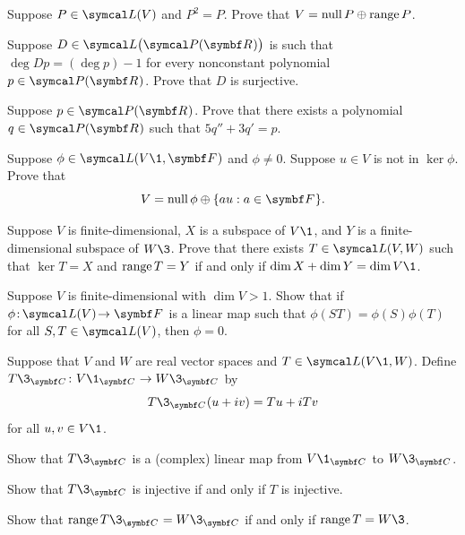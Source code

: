 \begin{exercises}

\exercise
Suppose $P \in \L(V)$ and $P^2 = P$.  Prove that $V = \operatorname{null} P \oplus \operatorname{range} P$.


\exercise
Suppose $D \in \L\bigl(\P(\R{})\bigr)$ is such that $\deg Dp = (\deg p) - 1$ for every nonconstant polynomial $p \in \P(\R{})$. Prove that $D$ is surjective.\label{3polydeg}


\exercise
Suppose $p \in \P(\R{})$. Prove that there exists a polynomial $q \in \P(\R{})$ such that $5 q'' + 3 q' = p$.


\exercise
Suppose $\phi \in \L(V\1, \F{})$ and $\phi \ne 0$. Suppose $u \in V$ is not in $\ker \phi$. Prove that
\[
V = \ker \phi \oplus \{au: a \in \F{}\}.
\]
\exercisedisplayend


\exercise
Suppose $V$ is finite-dimensional, $X$ is a subspace of $V\1$, and $Y$ is a finite-dimensional subspace of $W\3$. Prove that there exists $T \in \L(V, W)$ such that $\ker T = X$ and $\operatorname{range} T = Y$ if and only if
$\dim X + \dim Y = \dim V\1$.


\exercise
Suppose $V$ is finite-dimensional with $\dim V > 1$. Show that if \mbox{$\fun \phi {\!\L(V)\!} {\F{}}$} is a linear map such that
$
\phi(ST) = \phi(S) \phi(T)
$
for all $S, T \in \L(V)$, then $\phi = 0$.


\exercise
Suppose that $V$ and $W$ are real vector spaces and $T \in \L(V\1, W)$. Define $\fun {T\3_{\C{}}} {V\1_{\C{}}} {W\3_{\C{}}}$ by\label{3complexMap}
\[
T\3_{\C{}}(u + iv) = Tu + iTv
\]
for all $u, v \in V\1$.
\begin{subtheorem}
\item
Show that $T\3_{\C{}}$ is a (complex) linear map from $V\1_{\C{}}$ to $W\3_{\C{}}$.
\item
Show that $T\3_{\C{}}$ is injective if and only if $T$ is injective.
\item
Show that $\ran T\3_{\C{}} = W\3_{\C{}}$ if and only if $\ran T = W\3$.
\end{subtheorem}


\end{exercises}

